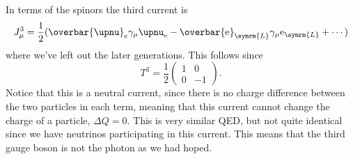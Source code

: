 \documentclass[fleqn]{NotesClass}
\newcommand{\Pparticle}[1]{\mathrm{#1}}
\newcommand{\Pex}{\ensuremath{\Pparticle{e}}}
\newcommand{\Pnu}{\ensuremath{\upnu}}
\newcommand{\Pnue}{\ensuremath{\upnu_{\mathrm{e}}}}
\newcommand{\diracadjoint}[1]{\overbar{#1}}
\newcommand{\Left}{\symrm{L}}
\begin{document}
    In terms of the spinors the third current is
    \begin{equation}
        J^3_\mu = \frac{1}{2}(\diracadjoint{\Pnu}_{\Pex} \gamma_\mu \Pnue - \diracadjoint{\Pex}_{\Left} \gamma_\mu \Pex_{\Left} + \dotsb)
    \end{equation}
    where we've left out the later generations.
    This follows since
    \begin{equation}
        T^3 = \frac{1}{2}
        \begin{pmatrix}
            1 & 0\\
            0 & -1
        \end{pmatrix}
        .
    \end{equation}
    Notice that this is a neutral current, since there is no charge difference between the two particles in each term, meaning that this current cannot change the charge of a particle, \(\Delta Q = 0\).
    This is very similar QED, but not quite identical since we have neutrinos participating in this current.
    This means that the third gauge boson is not the photon as we had hoped.
    
\end{document}
